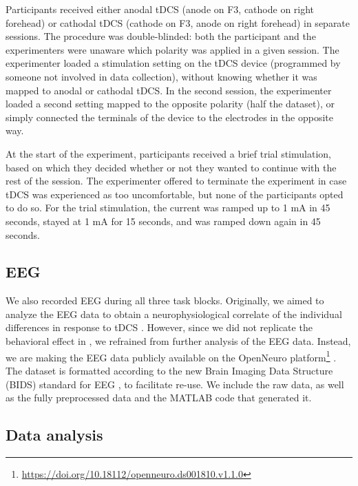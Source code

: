 \documentclass[11pt,]{memoir}
\let\rmarkdownfootnote\footnote%
\def\footnote{\protect\rmarkdownfootnote}
\renewcommand{\href}[2]{#2\footnote{\url{#1}}} %
\begin{document}
Participants received either anodal tDCS (anode on F3, cathode on right forehead) or cathodal tDCS (cathode on F3, anode on right forehead) in separate sessions. The procedure was double-blinded: both the participant and the experimenters were unaware which polarity was applied in a given session. The experimenter loaded a stimulation setting on the tDCS device (programmed by someone not involved in data collection), without knowing whether it was mapped to anodal or cathodal tDCS. In the second session, the experimenter loaded a second setting mapped to the opposite polarity (half the dataset), or simply connected the terminals of the device to the electrodes in the opposite way.

At the start of the experiment, participants received a brief trial stimulation, based on which they decided whether or not they wanted to continue with the rest of the session. The experimenter offered to terminate the experiment in case tDCS was experienced as too uncomfortable, but none of the participants opted to do so. For the trial stimulation, the current was ramped up to 1 mA in 45 seconds, stayed at 1 mA for 15 seconds, and was ramped down again in 45 seconds.

\hypertarget{AB_tDCS-EEGdata}{%
\subsection{EEG}\label{AB_tDCS-EEGdata}}

We also recorded EEG during all three task blocks. Originally, we aimed to analyze the EEG data to obtain a neurophysiological correlate of the individual differences in response to tDCS \autocites{Krause2014}{Li2015b}{Harty2017}. However, since we did not replicate the behavioral effect in \textcite{London2015}, we refrained from further analysis of the EEG data. Instead, we are making the EEG data publicly available \href{https://doi.org/10.18112/openneuro.ds001810.v1.1.0}{on the OpenNeuro platform} \autocite{Reteig2019_data}. The dataset is formatted according to the new Brain Imaging Data Structure (BIDS) standard \autocite{Gorgolewski2016} for EEG \autocite{Pernet2018}, to facilitate re-use. We include the raw data, as well as the fully preprocessed data and the MATLAB code that generated it.

\hypertarget{data-analysis}{%
\subsection{Data analysis}\label{data-analysis}}
\end{document}
